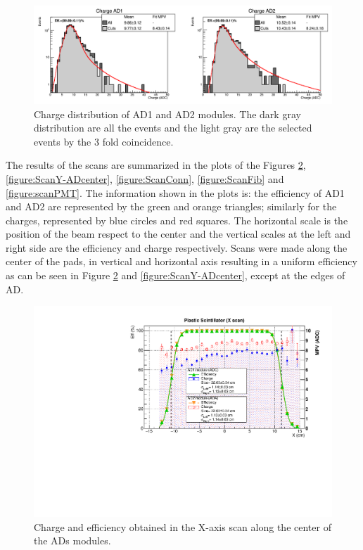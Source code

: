 	\begin{figure}[h!]
	  	\begin{center}
	  		\includegraphics[scale=0.37]{./images/scan/Charge_distribution.png}
	  		\caption{
		  		Charge distribution of AD1 and AD2 modules. The dark gray distribution are all the events and
		  		the light gray are the selected events by the 3 fold coincidence. 
	  		}
	  		\label{figure:Charge_distribution}
	  	\end{center}
	\end{figure}
	The results of the scans are summarized in the plots of the Figures \ref{figure:ScanX-ADcenter}, \ref{figure:ScanY-ADcenter},
	\ref{figure:ScanConn}, \ref{figure:ScanFib} and \ref{figure:scanPMT}. 
	The information shown in the plots is: the efficiency of AD1 and AD2 are represented by the green and orange triangles; 
	similarly for the charges, represented by blue circles and red squares. The horizontal scale is the position 
	of the beam respect to the center and the vertical scales at the left and right side are the efficiency and 
	charge respectively.
	Scans were made along the center of the pads, in vertical and horizontal axis resulting in a uniform
	efficiency as can be seen in Figure \ref{figure:ScanX-ADcenter} and \ref{figure:ScanY-ADcenter}, except at the 
	edges of AD. 
	
	\begin{figure}[h!]%
		\begin{center}
			\includegraphics[scale=0.5]{./images/scan/Xaxis_scan.pdf}
			\caption{
				Charge and efficiency obtained in the X-axis scan along the center of the ADs modules.
			}
			\label{figure:ScanX-ADcenter}
		\end{center}
	\end{figure}
	
